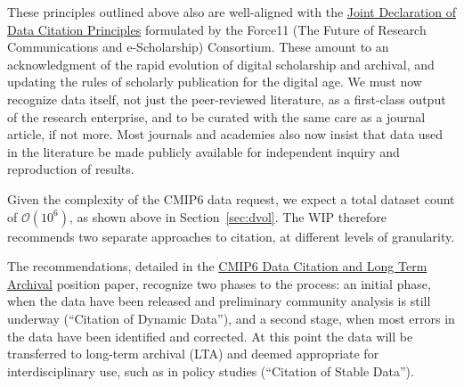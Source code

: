 \documentclass[gmd,manuscript]{copernicus}
\newcommand{\secref}[1] {\mbox{Section  \ref{sec:#1}}}
\begin{document}
These principles outlined above also are well-aligned with the
\href{https://goo.gl/Pzb7F6}{Joint Declaration of Data Citation
  Principles} formulated by the Force11 (The Future of Research
Communications and e-Scholarship) Consortium. These amount to an
acknowledgment of the rapid evolution of digital scholarship and
archival, and updating the rules of scholarly publication for the
digital age. We must now recognize data itself, not just the
peer-reviewed literature, as a first-class output of the research
enterprise, and to be curated with the same care as a journal article,
if not more. Most journals and academies also now insist that data used
in the literature be made publicly available for independent
inquiry and reproduction of results.

Given the complexity of the CMIP6 data request, we expect a total
dataset count of $\mathcal{O}(10^6)$, as shown above in \secref{dvol}.
The WIP therefore recommends two separate approaches to citation, at
different levels of granularity.

The recommendations, detailed in the
\href{https://goo.gl/CZyWq1}{CMIP6 Data Citation and Long Term
  Archival} position paper, recognize two phases to the process: an
initial phase, when the data have been released and preliminary
community analysis is still underway (``Citation of Dynamic Data''),
and a second stage, when most errors in the data have been identified
and corrected. At this point the data will be transferred to long-term
archival (LTA) and deemed appropriate for interdisciplinary
use, such as in policy studies (``Citation of Stable Data'').
\end{document}
